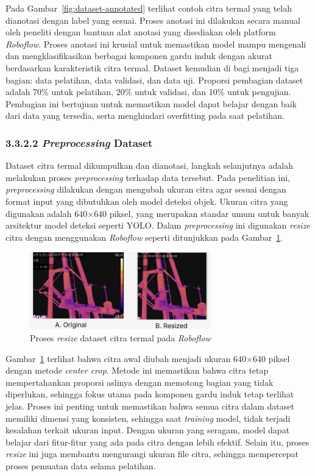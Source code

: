 Pada Gambar~\ref{fig:dataset-annotated} terlihat contoh citra termal yang telah dianotasi dengan label yang sesuai. Proses anotasi ini dilakukan secara manual oleh peneliti dengan bantuan alat anotasi yang disediakan oleh platform \emph{Roboflow}. Proses anotasi ini krusial untuk memastikan model mampu mengenali dan mengklasifikasikan berbagai komponen gardu induk dengan akurat berdasarkan karakteristik citra termal. Dataset kemudian di bagi menjadi tiga bagian: data pelatihan, data validasi, dan data uji. Proporsi pembagian dataset adalah 70\% untuk pelatihan, 20\% untuk validasi, dan 10\% untuk pengujian. Pembagian ini bertujuan untuk memastikan model dapat belajar dengan baik dari data yang tersedia, serta menghindari overfitting pada saat pelatihan.

\subsubsection{3.3.2.2 \emph{Preprocessing} Dataset}
Dataset citra termal dikumpulkan dan dianotasi, langkah selanjutnya adalah melakukan proses \emph{preprocessing} terhadap data tersebut. Pada penelitian ini, \emph{preprocessing} dilakukan dengan mengubah ukuran citra agar sesuai dengan format input yang dibutuhkan oleh model deteksi objek. Ukuran citra yang digunakan adalah 640$\times$640 piksel, yang merupakan standar umum untuk banyak arsitektur model deteksi seperti YOLO. Dalam \emph{preprocessing} ini digunakan \emph{resize} citra dengan menggunakan \emph{Roboflow} seperti ditunjukkan pada 
Gambar~\ref{fig:dataset-resize}.

\begin{figure}[H]
  \centering
  \includegraphics[width=0.7\textwidth]{gambar/bab3/prep-resize.png}
  \caption{Proses \emph{resize} dataset citra termal pada \emph{Roboflow}}
  \label{fig:dataset-resize}
\end{figure}

Gambar~\ref{fig:dataset-resize} terlihat bahwa citra awal diubah menjadi ukuran 640$\times$640 piksel dengan metode \emph{center crop}. Metode ini memastikan bahwa citra tetap mempertahankan proporsi aslinya dengan memotong bagian yang tidak diperlukan, sehingga fokus utama pada komponen gardu induk tetap terlihat jelas.  Proses ini penting untuk memastikan bahwa semua citra dalam dataset memiliki dimensi yang konsisten, sehingga saat \emph{training} model, tidak terjadi kesalahan terkait ukuran input. Dengan ukuran yang seragam, model dapat belajar dari fitur-fitur yang ada pada citra dengan lebih efektif. Selain itu, proses \emph{resize} ini juga membantu mengurangi ukuran file citra, sehingga mempercepat proses pemuatan data selama pelatihan. 

